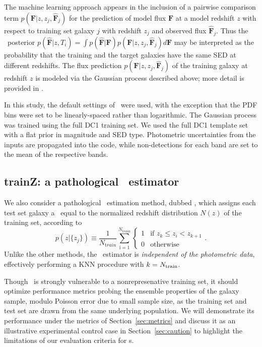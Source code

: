 The machine learning approach appears in the inclusion of a pairwise comparison term $p(\mathbf{F} \vert z, z_j, \mathbf{\hat{F}}_j)$ for the prediction of model flux $\mathbf{F}$ at a model redshift $z$ with respect to training set galaxy $j$ with redshift $z_j$ and observed flux $\mathbf{\hat{F}}_j$.
Thus the \pz\ posterior $p(\mathbf{\hat{F}} \vert z, T_i) = \int p(\mathbf{\hat{F}} \vert \mathbf{F}) p(\mathbf{F} \vert z, z_j, \mathbf{\hat{F}}_j) d\mathbf{F}$ may be interpreted as the probability that the training and the target galaxies have the same SED at different redshifts.
The flux prediction $p(\mathbf{F} \vert z, z_j, \mathbf{\hat{F}}_j)$ of the training galaxy at redshift $z$ is modeled via the Gaussian process described above; more detail is provided in \citet{Leistedt:17}.

In this study, the default settings of \delight\ were used, with the exception that the PDF bins were set to be linearly-spaced rather than logarithmic.
The Gaussian process was trained using the full DC1 training set.
We used the full DC1 template set with a flat prior in magnitude and SED type.
Photometric uncertainties from the inputs are propagated into the code, while non-detections for each band are set to the mean of the respective bands.

\subsection{trainZ: a pathological \pz\ estimator}
\label{sec:trainz}

We also consider a pathological \pzpdf\ estimation method, dubbed \trainz, which assigns each test set galaxy a \pzpdf\ equal to the normalized redshift distribution $N(z)$ of the training set, according to
\begin{equation}
	p(z \vert \{z_{j}\}) \equiv \frac{1}{N_{ \mathrm train}}\sum_{\mathrm i=1}^{N_{\mathrm train}} \begin{cases} 1 & \text{if\ } z_{k}\leq z_{i} < z_{k+1}\\ 0 & \text{otherwise} \end{cases}.
\end{equation}
Unlike the other methods, the \trainz\ estimator is \textit{independent of the photometric data}, effectively performing a KNN procedure with $k=N_{\rm train}$.

Though \trainz\ is strongly vulnerable to a nonrepresenative training set, it should optimize performance metrics probing the ensemble properties of the galaxy sample, modulo Poisson error due to small sample size, as the training set and test set are drawn from the same underlying population.
We will demonstrate its performance under the metrics of Section~\ref{sec:metrics} and discuss it as an illustrative experimental control case in Section~\ref{sec:caution} to highlight the limitations of our evaluation criteria for \pzpdf s.
